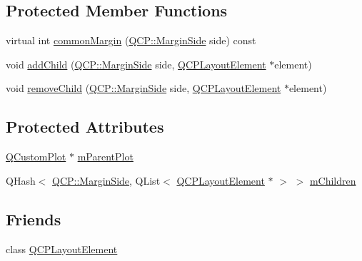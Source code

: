 \subsection*{Protected Member Functions}
\begin{DoxyCompactItemize}
\item 
virtual int \mbox{\hyperlink{class_q_c_p_margin_group_aea6a00373b3a0305de56c34d2423ea99}{common\+Margin}} (\mbox{\hyperlink{namespace_q_c_p_a7e487e3e2ccb62ab7771065bab7cae54}{Q\+C\+P\+::\+Margin\+Side}} side) const
\item 
void \mbox{\hyperlink{class_q_c_p_margin_group_acb9c3a35acec655c2895b7eb95ee0524}{add\+Child}} (\mbox{\hyperlink{namespace_q_c_p_a7e487e3e2ccb62ab7771065bab7cae54}{Q\+C\+P\+::\+Margin\+Side}} side, \mbox{\hyperlink{class_q_c_p_layout_element}{Q\+C\+P\+Layout\+Element}} $\ast$element)
\item 
void \mbox{\hyperlink{class_q_c_p_margin_group_a20ab3286062957d99b58db683fe725b0}{remove\+Child}} (\mbox{\hyperlink{namespace_q_c_p_a7e487e3e2ccb62ab7771065bab7cae54}{Q\+C\+P\+::\+Margin\+Side}} side, \mbox{\hyperlink{class_q_c_p_layout_element}{Q\+C\+P\+Layout\+Element}} $\ast$element)
\end{DoxyCompactItemize}
\subsection*{Protected Attributes}
\begin{DoxyCompactItemize}
\item 
\mbox{\hyperlink{class_q_custom_plot}{Q\+Custom\+Plot}} $\ast$ \mbox{\hyperlink{class_q_c_p_margin_group_a23cfa29e3cc0f33a59141b77d8c04edf}{m\+Parent\+Plot}}
\item 
Q\+Hash$<$ \mbox{\hyperlink{namespace_q_c_p_a7e487e3e2ccb62ab7771065bab7cae54}{Q\+C\+P\+::\+Margin\+Side}}, Q\+List$<$ \mbox{\hyperlink{class_q_c_p_layout_element}{Q\+C\+P\+Layout\+Element}} $\ast$ $>$ $>$ \mbox{\hyperlink{class_q_c_p_margin_group_a954bc89ff8958b9bb6a4a0d08ed5fc0f}{m\+Children}}
\end{DoxyCompactItemize}
\subsection*{Friends}
\begin{DoxyCompactItemize}
\item 
class \mbox{\hyperlink{class_q_c_p_margin_group_a0790750c7e7f14fdbd960d172655b42b}{Q\+C\+P\+Layout\+Element}}
\end{DoxyCompactItemize}


